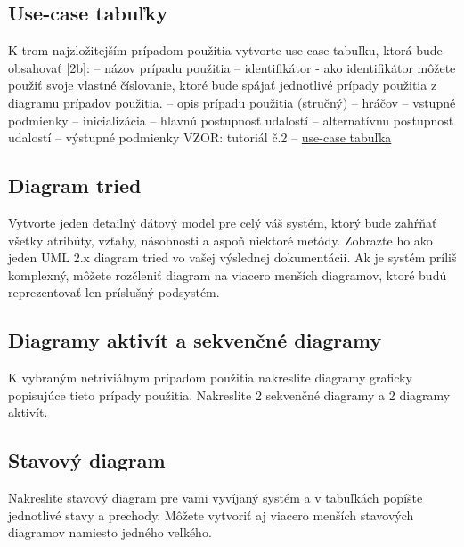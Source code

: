 \subsection{Use-case tabuľky}
K trom najzložitejším prípadom použitia vytvorte use-case tabuľku, ktorá
bude obsahovať [2b]:
– názov prípadu použitia
– identifikátor - ako identifikátor môžete použiť svoje vlastné číslovanie, ktoré bude
spájať jednotlivé prípady použitia z diagramu prípadov použitia.
– opis prípadu použitia (stručný)
– hráčov
– vstupné podmienky
– inicializácia
– hlavnú postupnosť udalostí
– alternatívnu postupnosť udalostí
– výstupné podmienky
VZOR: tutoriál č.2 – \href{https://uim.fei.stuba.sk/wp-content/uploads/2022/09/CV2-USC_tabulka_TUTORIAL.pdf}{use-case tabuľka}

\subsection{Diagram tried}
Vytvorte jeden detailný dátový model pre celý váš systém, ktorý bude zahŕňať
všetky atribúty, vzťahy, násobnosti a aspoň niektoré metódy. Zobrazte ho ako jeden UML 2.x
diagram tried vo vašej výslednej dokumentácii. Ak je systém príliš komplexný, môžete rozčleniť
diagram na viacero menších diagramov, ktoré budú reprezentovať len príslušný podsystém.

\subsection{Diagramy aktivít a sekvenčné diagramy}
K vybraným netriviálnym prípadom použitia nakreslite
diagramy graficky popisujúce tieto prípady použitia. Nakreslite 2 sekvenčné diagramy a 2
diagramy aktivít.

\subsection{Stavový diagram}
Nakreslite stavový diagram pre vami vyvíjaný systém a v tabuľkách popíšte
jednotlivé stavy a prechody. Môžete vytvoriť aj viacero menších stavových diagramov namiesto
jedného veľkého.


